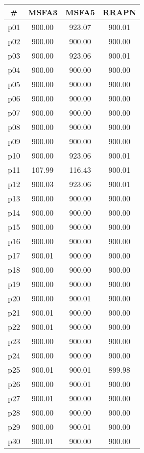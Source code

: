 \begin{tabular}{cccc}
\toprule
\textbf{\#} & \textbf{MSFA3} & \textbf{MSFA5} & \textbf{RRAPN}\\
\midrule
p01 & 900.00 & 923.07 & 900.01\\
p02 & 900.00 & 900.00 & 900.00\\
p03 & 900.00 & 923.06 & 900.01\\
p04 & 900.00 & 900.00 & 900.00\\
p05 & 900.00 & 900.00 & 900.00\\
p06 & 900.00 & 900.00 & 900.00\\
p07 & 900.00 & 900.00 & 900.00\\
p08 & 900.00 & 900.00 & 900.00\\
p09 & 900.00 & 900.00 & 900.00\\
p10 & 900.00 & 923.06 & 900.01\\
p11 & 107.99 & 116.43 & 900.01\\
p12 & 900.03 & 923.06 & 900.01\\
p13 & 900.00 & 900.00 & 900.00\\
p14 & 900.00 & 900.00 & 900.00\\
p15 & 900.00 & 900.00 & 900.00\\
p16 & 900.00 & 900.00 & 900.00\\
p17 & 900.01 & 900.00 & 900.00\\
p18 & 900.00 & 900.00 & 900.00\\
p19 & 900.00 & 900.00 & 900.00\\
p20 & 900.00 & 900.01 & 900.00\\
p21 & 900.01 & 900.00 & 900.00\\
p22 & 900.01 & 900.00 & 900.00\\
p23 & 900.00 & 900.00 & 900.00\\
p24 & 900.00 & 900.00 & 900.00\\
p25 & 900.01 & 900.01 & 899.98\\
p26 & 900.00 & 900.01 & 900.00\\
p27 & 900.01 & 900.00 & 900.00\\
p28 & 900.00 & 900.00 & 900.00\\
p29 & 900.00 & 900.01 & 900.00\\
p30 & 900.01 & 900.00 & 900.00\\
\bottomrule
\end{tabular}


